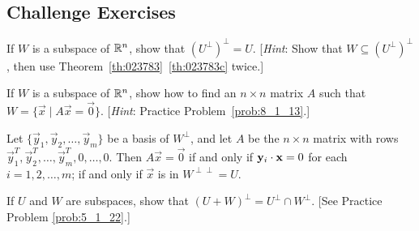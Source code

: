 \documentclass{ximera}
\begin{document}
\subsection*{Challenge Exercises}

\begin{problem}\label{prob:8_1_13}
If $W$ is a subspace of $\mathbb{R}^n$, show that $\left(U^{\perp}\right)^\perp = U$. [\textit{Hint}: Show that $W \subseteq \left(U^{\perp}\right)^\perp$, then use Theorem~\ref{th:023783}~\ref{th:023783c} twice.]
\end{problem}

\begin{problem}\label{prob:8_1_14}
If $W$ is a subspace of $\mathbb{R}^n$, show how to find an $n \times n$ matrix $A$ such that $W = \{\vec{x} \mid A\vec{x} = \vec{0}\}$. [\textit{Hint}: Practice Problem~\ref{prob:8_1_13}.]

\begin{hint}
Let $\{\vec{y}_{1}, \vec{y}_{2}, \dots, \vec{y}_{m}\}$ be a basis of $W^\perp$, and let $A$ be the $n \times n$ matrix with rows $\vec{y}^T_1, \vec{y}^T_2, \dots, \vec{y}^T_m, 0, \dots, 0$. Then $A\vec{x} = \vec{0}$ if and only if $\mathbf{y}_{i} \cdot \mathbf{x} = 0$ for each $i = 1, 2, \dots, m$; if and only if $\vec{x}$ is in $W^{\perp \perp} = U$.
\end{hint}
\end{problem}

\begin{problem}\label{prob:8_1_16}
If $U$ and $W$ are subspaces, show that $(U + W)^\perp = U^\perp \cap W^\perp$. [See Practice Problem \ref{prob:5_1_22}.]
\end{problem}
\end{document}
